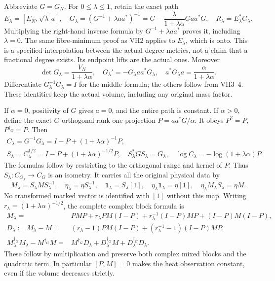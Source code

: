 \documentclass[11pt]{article}
\begin{document}
Abbreviate \(G=G_N\). For \(0\le\lambda\le1\), retain the exact path
\begin{equation}\tag{VH4}\label{VH4}
E_\lambda=[E_N,\sqrt\lambda\,a],\quad
G_\lambda=(G^{-1}+\lambda aa^*)^{-1}
=G-\frac{\lambda}{1+\lambda\alpha}Gaa^*G,\quad
R_\lambda=E_\lambda^*G_\lambda.
\end{equation}
Multiplying the right-hand inverse formula by \(G^{-1}+\lambda aa^*\)
proves it, including \(\lambda=0\). The same fibre-minimum proof as
VH2 applies to \(E_\lambda\), which is onto. This is a specified
interpolation between the actual degree metrics, not a claim that a
fractional degree exists. Its endpoint lifts are the actual ones.
Moreover
\begin{equation}\tag{VH5}\label{VH5}
\det G_\lambda=\frac{V_N}{1+\lambda\alpha},\quad
G_\lambda'=-G_\lambda aa^*G_\lambda,\quad
a^*G_\lambda a=\frac{\alpha}{1+\lambda\alpha}.
\end{equation}
Differentiate \(G_\lambda^{-1}G_\lambda=I\) for the middle formula;
the others follow from VH3--4. These identities keep the actual
volume, including any original mass factor.

If \(\alpha=0\), positivity of \(G\) gives \(a=0\), and the entire
path is constant. If \(\alpha>0\), define the exact \(G\)-orthogonal
rank-one projection
\(P=aa^*G/\alpha\). It obeys \(P^2=P\), \(P^{\dagger_G}=P\).
Then
\begin{equation}\tag{VH6}\label{VH6}
\begin{gathered}
C_\lambda=G^{-1}G_\lambda=I-P+(1+\lambda\alpha)^{-1}P,\\
S_\lambda=C_\lambda^{1/2}=I-P+(1+\lambda\alpha)^{-1/2}P,\quad
S_\lambda^*GS_\lambda=G_\lambda,\quad
\log C_\lambda=-\log(1+\lambda\alpha)P.
\end{gathered}
\end{equation}
The formulas follow by restricting to the orthogonal range and kernel
of \(P\). Thus \(S_\lambda:C_{G_\lambda}\to C_G\) is an isometry.
It carries all the original physical data by
\begin{equation}\tag{VH7}\label{VH7}
M_\lambda=S_\lambda MS_\lambda^{-1},\quad
\eta_\lambda=\eta S_\lambda^{-1},\quad
\mathbf1_\lambda=S_\lambda[1],\quad
\eta_\lambda\mathbf1_\lambda=\eta[1],\quad
\eta_\lambda M_\lambda S_\lambda=\eta M.
\end{equation}
No transformed marked vector is identified with \([1]\) without this
map. Writing \(r_\lambda=(1+\lambda\alpha)^{-1/2}\), the complete
complex block formula is
\begin{equation}\tag{VH8}\label{VH8}
\begin{split}
M_\lambda={}&PMP+r_\lambda PM(I-P)
+r_\lambda^{-1}(I-P)MP+(I-P)M(I-P),\\
D_\lambda:=M_\lambda-M={}&(r_\lambda-1)PM(I-P)
+(r_\lambda^{-1}-1)(I-P)MP,\\
M_\lambda^{\dagger_G}M_\lambda-M^{\dagger_G}M
={}&M^{\dagger_G}D_\lambda+D_\lambda^{\dagger_G}M
+D_\lambda^{\dagger_G}D_\lambda.
\end{split}
\end{equation}
These follow by multiplication and preserve both complex mixed blocks
and the quadratic term. In particular \([P,M]=0\) makes the heat
observation constant, even if the volume decreases strictly.
\end{document}
